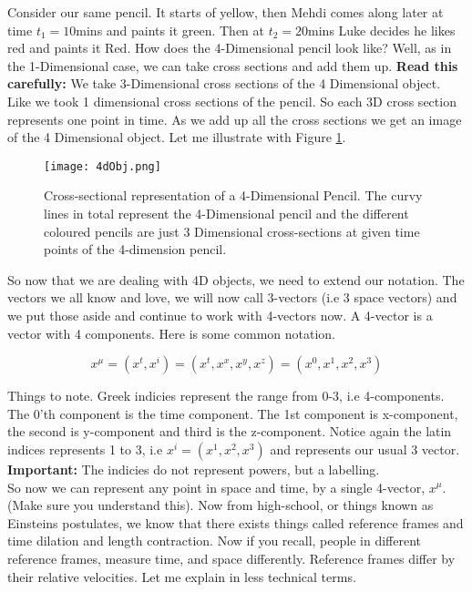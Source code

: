 Consider our same pencil. It starts of yellow, then Mehdi comes along later at time $t_1=10$mins and paints it green. Then at $t_2=20$mins Luke decides he likes red and paints it Red. How does the 4-Dimensional pencil look like? Well, as in the 1-Dimensional case, we can take cross sections and add them up. \textbf{Read this carefully:} We take 3-Dimensional cross sections of the 4 Dimensional object. Like we took 1 dimensional cross sections of the pencil. So each 3D cross section represents one point in time. As we add up all the cross sections we get an image of the 4 Dimensional object. Let me illustrate with Figure \ref{fig:4dobj}. 

\begin{figure}[h]
\centering
\texttt{[image: 4dObj.png]}
\caption{Cross-sectional representation of a 4-Dimensional Pencil. The curvy lines in total represent the 4-Dimensional pencil and the different coloured pencils are just 3 Dimensional cross-sections at given time points of the 4-dimension pencil.}
\label{fig:4dobj}
\end{figure}

So now that we are dealing with 4D objects, we need to extend our notation. The vectors we all know and love, we will now call 3-vectors (i.e 3 space vectors) and we put those aside and continue to work with 4-vectors now. A 4-vector is a vector with 4 components. Here is some common notation. 

\begin{equation}
  x^\mu = (x^t, x^i) = (x^t, x^x, x^y, x^z) = (x^0, x^1, x^2, x^3)
\end{equation}

Things to note. Greek indicies represent the range from 0-3, i.e 4-components. The 0'th component is the time component. The 1st component is x-component, the second is y-component and third is the z-component. Notice again the latin indices represents 1 to 3, i.e $x^i = (x^1, x^2, x^3)$ and represents our usual 3 vector. \textbf{Important:} The indicies do not represent powers, but a labelling. \\

So now we can represent any point in space and time, by a single 4-vector, $x^{\mu}$. (Make sure you understand this). Now from high-school, or things known as Einsteins postulates, we know that there exists things called reference frames and time dilation and length contraction. Now if you recall, people in different reference frames, measure time, and space differently. Reference frames differ by their relative velocities. Let me explain in less technical terms. \\

